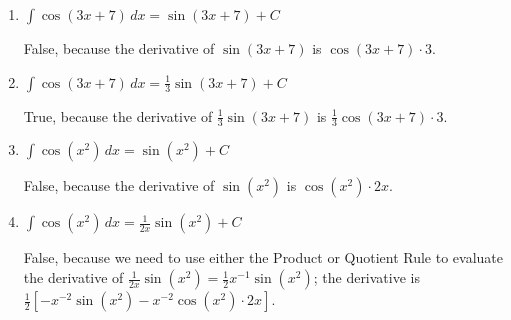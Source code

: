 \documentclass{article}
\begin{document}
\begin{enumerate}
\begin{enumerate}
\begin{enumerate}
    \item
      \begin{problem}
        $\displaystyle \int \cos (3x + 7)\,dx = \sin(3x + 7) + C$
      \end{problem}

      \begin{solution} %
        False, because the derivative of $\sin(3x + 7)$ is $\cos(3x + 7)
        \cdot 3$.
      \end{solution}

    \item
      \begin{problem}
        $\displaystyle \int \cos (3x + 7)\,dx = \frac{1}{3} \sin (3x + 7)
        + C$
      \end{problem}

      \begin{solution} %
        True, because the derivative of $\frac{1}{3} \sin(3x + 7)$ is
        $\frac{1}{3} \cos(3x + 7) \cdot 3$.
      \end{solution}

    \item
      \begin{problem}
        $\displaystyle \int \cos (x^2)\,dx = \sin (x^2) + C$
      \end{problem}

      \begin{solution} %
        False, because the derivative of $\sin(x^2)$ is $\cos(x^2) \cdot
        2x$. 
      \end{solution}

    \item
      \begin{problem}
        $\displaystyle \int \cos (x^2)\,dx = \frac{1}{2x} \sin (x^2) + C$
      \end{problem}

      \begin{solution} %
        False, because we need to use either the Product or Quotient
        Rule to evaluate the derivative of $\frac{1}{2x} \sin (x^2) =
        \frac{1}{2} x^{-1} \sin(x^2)$; the derivative is $\frac{1}{2}
        \left[ - x^{-2} \sin(x^2) - x^{-2} \cos(x^2) \cdot 2x \right]$.
      \end{solution}

    \end{enumerate}
    \probonly{}



\end{enumerate}
\end{enumerate}
\end{document}
